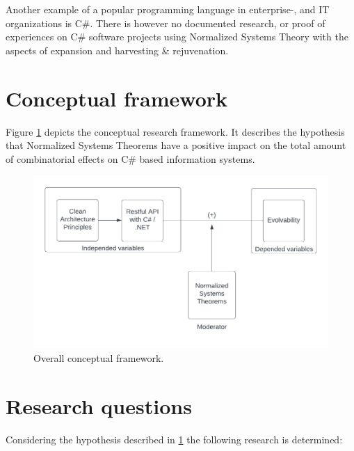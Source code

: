 Another example of a popular programming language in enterprise-, and IT organizations is
C\#. There is however no documented research, or proof of experiences on C\# software
projects using Normalized Systems Theory with the aspects of expansion and harvesting \&
rejuvenation.

\section{Conceptual framework} \label{conceptual_framework}
Figure \ref{fig:overall_conceptual_framework} depicts the conceptual research framework.
It describes the hypothesis that Normalized Systems Theorems have a positive impact on the
total amount of combinatorial effects on C\# based information systems.

\begin{figure}[!h]
    \centering
    \includegraphics[width=1\textwidth]{Figures/overall_conceptual_framework}
    \caption[Overall conceptual framework]{Overall conceptual framework.}
    \label{fig:overall_conceptual_framework}
\end{figure}
\newpage
\section{Research questions} \label{research_questions}
Considering the hypothesis described in \ref{conceptual_framework} the following research
is determined:

